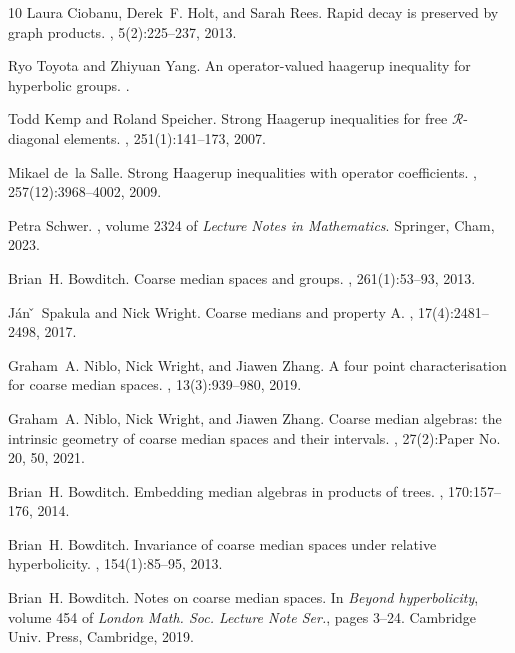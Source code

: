 \documentclass[12pt,reqno]{amsart}
\numberwithin{equation}{section}
\begin{document}
\begin{thebibliography}{10}
Laura Ciobanu, Derek~F. Holt, and Sarah Rees.
\newblock Rapid decay is preserved by graph products.
, 5(2):225--237, 2013.

Ryo Toyota and Zhiyuan Yang.
\newblock An operator-valued haagerup inequality for hyperbolic groups.
.

Todd Kemp and Roland Speicher.
\newblock Strong {H}aagerup inequalities for free {$\mathcal{R}$}-diagonal
  elements.
, 251(1):141--173, 2007.

Mikael de~la Salle.
\newblock Strong {H}aagerup inequalities with operator coefficients.
, 257(12):3968--4002, 2009.

Petra Schwer.
, volume 2324
  of {\em Lecture Notes in Mathematics}.
\newblock Springer, Cham, 2023.

Brian~H. Bowditch.
\newblock Coarse median spaces and groups.
, 261(1):53--93, 2013.

J\'an \v~Spakula and Nick Wright.
\newblock Coarse medians and property {A}.
, 17(4):2481--2498, 2017.

Graham~A. Niblo, Nick Wright, and Jiawen Zhang.
\newblock A four point characterisation for coarse median spaces.
, 13(3):939--980, 2019.

Graham~A. Niblo, Nick Wright, and Jiawen Zhang.
\newblock Coarse median algebras: the intrinsic geometry of coarse median
  spaces and their intervals.
, 27(2):Paper No. 20, 50, 2021.

Brian~H. Bowditch.
\newblock Embedding median algebras in products of trees.
, 170:157--176, 2014.

Brian~H. Bowditch.
\newblock Invariance of coarse median spaces under relative hyperbolicity.
, 154(1):85--95, 2013.

Brian~H. Bowditch.
\newblock Notes on coarse median spaces.
\newblock In {\em Beyond hyperbolicity}, volume 454 of {\em London Math. Soc.
  Lecture Note Ser.}, pages 3--24. Cambridge Univ. Press, Cambridge, 2019.


\end{thebibliography}
\end{document}
